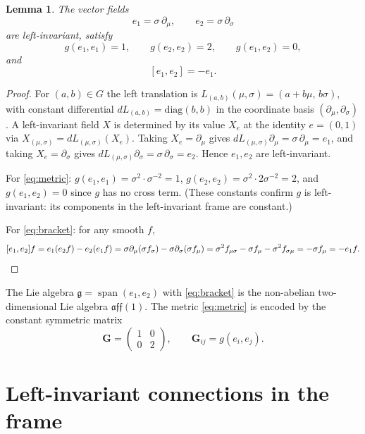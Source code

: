 \documentclass{amsart}
\newtheorem{lemma}{Lemma}
\theoremstyle{definition}
\theoremstyle{remark}
\begin{document}
\begin{lemma}\label{lem:frame}
The vector fields
\[
e_1=\sigma\,\partial_\mu,\qquad e_2=\sigma\,\partial_\sigma
\]
are left-invariant, satisfy
\begin{equation}\label{eq:metric}
g(e_1,e_1)=1,\qquad g(e_2,e_2)=2,\qquad g(e_1,e_2)=0,
\end{equation}
and
\begin{equation}\label{eq:bracket}
[e_1,e_2]=-e_1.
\end{equation}
\end{lemma}

\begin{proof}
For $(a,b)\in G$ the left translation is $L_{(a,b)}(\mu,\sigma)=(a+b\mu,\,b\sigma)$, with constant
differential $d L_{(a,b)}=\mathrm{diag}(b,b)$ in the coordinate basis $(\partial_\mu,\partial_\sigma)$.
A left-invariant field $X$ is determined by its value $X_e$ at the identity $e=(0,1)$ via
$X_{(\mu,\sigma)}=dL_{(\mu,\sigma)}(X_e)$. Taking $X_e=\partial_\mu$ gives
$dL_{(\mu,\sigma)}\partial_\mu=\sigma\,\partial_\mu=e_1$, and taking $X_e=\partial_\sigma$ gives
$dL_{(\mu,\sigma)}\partial_\sigma=\sigma\,\partial_\sigma=e_2$. Hence $e_1,e_2$ are left-invariant.

For \eqref{eq:metric}: $g(e_1,e_1)=\sigma^2\cdot\sigma^{-2}=1$, $g(e_2,e_2)=\sigma^2\cdot 2\sigma^{-2}=2$,
and $g(e_1,e_2)=0$ since $g$ has no cross term. (These constants confirm $g$ is left-invariant:
its components in the left-invariant frame are constant.)

For \eqref{eq:bracket}: for any smooth $f$,
\[
[e_1,e_2]f=e_1(e_2 f)-e_2(e_1 f)
=\sigma\partial_\mu(\sigma f_\sigma)-\sigma\partial_\sigma(\sigma f_\mu)
=\sigma^2 f_{\mu\sigma}-\sigma f_\mu-\sigma^2 f_{\sigma\mu}=-\sigma f_\mu=-e_1 f. \qedhere
\]
\end{proof}

The Lie algebra $\mathfrak{g}=\operatorname{span}(e_1,e_2)$ with \eqref{eq:bracket} is the non-abelian
two-dimensional Lie algebra $\mathfrak{aff}(1)$. The metric \eqref{eq:metric} is encoded by the constant
symmetric matrix
\begin{equation}\label{eq:Gmat}
\mathbf{G}=\begin{pmatrix}1&0\\0&2\end{pmatrix},\qquad \mathbf{G}_{ij}=g(e_i,e_j).
\end{equation}

\section{Left-invariant connections in the frame}\label{sec:conn}
\end{document}
